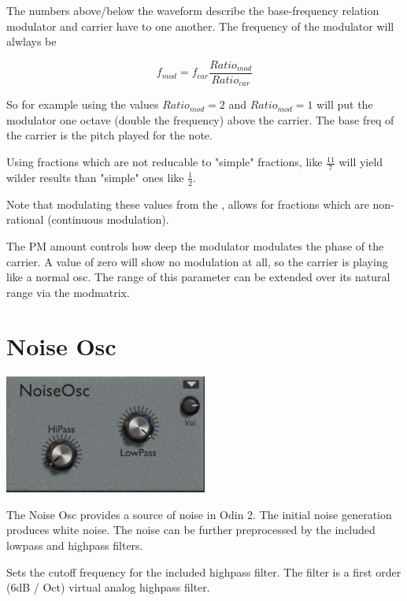 {The numbers above/below the waveform describe the base-frequency relation modulator and carrier have to one another. The frequency of the modulator will alwlays be

\begin{equation}
    f_{mod} = f_{car} \frac{Ratio_{mod}}{Ratio_{car}}
\end{equation}

So for example using the values $Ratio_{mod} = 2$ and $Ratio_{mod} = 1$ will put the modulator one octave (double the frequency) above the carrier. The base freq of the carrier is the pitch played for the note.

Using fractions which are not reducable to "simple" fractions, like $\frac{11}{7}$ will yield wilder results than "simple" ones like $\frac{1}{2}$.

Note that modulating these values from the \modmatrix, allows for fractions which are non-rational (continuous modulation).}

{The PM amount controls how deep the modulator modulates the phase of the carrier. A value of zero will show no modulation at all, so the carrier is playing like a normal osc. The range of this parameter can be extended over its natural range via the modmatrix.}

\section{Noise Osc}
\begin{center}
    \includegraphics[width=0.5\textwidth]{graphics/noise_osc.png}
\end{center}

The Noise Osc provides a source of noise in Odin 2. The initial noise generation produces white noise. The noise can be further preprocessed by the included lowpass and highpass filters.

{Sets the cutoff frequency for the included highpass filter. The filter is a first order (6dB / Oct) virtual analog highpass filter.}

